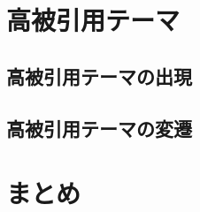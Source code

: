 \documentclass[12pt,a4paper,twocolumn,twoside]{ujsikpb}
\begin{document}
\section{高被引用テーマ}

\subsection{高被引用テーマの出現}




\subsection{高被引用テーマの変遷}








\section{まとめ}



%
%



\end{document}
